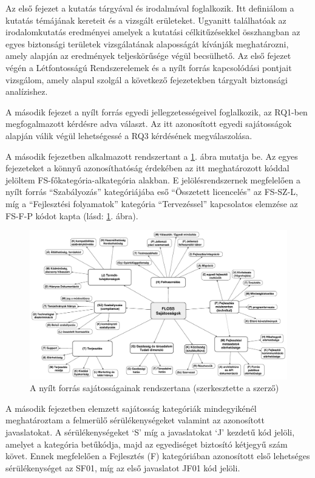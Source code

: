 \documentclass[12pt,magyar,a4paper,oneside]{scrreprt}
\begin{document}
Az első fejezet a kutatás tárgyával és irodalmával foglalkozik. Itt
definiálom a kutatás témájának kereteit és a vizsgált erületeket.
Ugyanitt találhatóak az irodalomkutatás eredményei amelyek a kutatási
célkitűzésekkel összhangban az egyes biztonsági területek vizsgálatának
alaposságát kívánják meghatározni, amely alapján az eredmények
teljeskörűsége végül becsülhető. Az első fejezet végén a Létfontosságú
Rendszerelemek és a nyílt forrás kapcsolódási pontjait vizsgálom, amely
alapul szolgál a következő fejezetekben tárgyalt biztonsági analízishez.

A második fejezet a nyílt forrás egyedi jellegzetességeivel foglalkozik,
az RQ1-ben megfogalmazott kérdésre adva választ. Az itt azonosított
egyedi sajátosságok alapján válik végül lehetségessé a RQ3 kérdésének
megválaszolása.

A második fejezetben alkalmazott rendszertant a \ref{fig:FLOSSSaj}. ábra
mutatja be. Az egyes fejezeteket a könnyű azonosíthatóság érdekében az
itt meghatározott kóddal jelöltem FS-főkategória-alkategória alakban. E
jelölésrendszernek megfelelően a nyílt forrás ``Szabályozás''
kategóriájába eső ``Összetett licencelés'' az FS-SZ-L, míg a
``Fejlesztési folyamatok'' kategória ``Tervezéssel'' kapcsolatos
elemzése az FS-F-P kódot kapta (lásd: \ref{fig:FLOSSSaj}. ábra).

\begin{figure}
\hypertarget{fig:FLOSSSaj}{%
\centering
\includegraphics{ábrák/FLOSS-jellegzetességek.pdf}
\caption{A nyílt forrás sajátosságainak rendszertana (szerkesztette a
szerző)}\label{fig:FLOSSSaj}
}
\end{figure}

A második fejezetben elemzett sajátosság kategóriák mindegyikénél
meghatároztam a felmerülő sérülékenységeket valamint az azonosított
javaslatokat. A sérülékenységeket `S' míg a javaslatokat `J' kezdetű kód
jelöli, amelyet a kategória betűkódja, majd az egyediséget biztosító
kétjegyű szám követ. Ennek megfelelően a Fejlesztés (F) kategóriában
azonosított első lehetséges sérülékenységet az SF01, míg az első
javaslatot JF01 kód jelöli.
\end{document}
